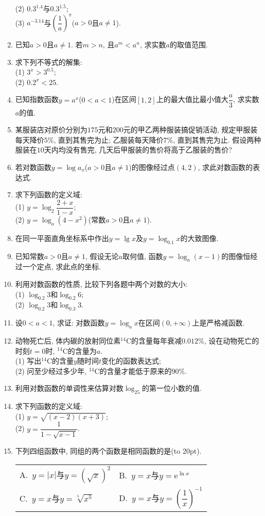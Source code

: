 \documentclass[10pt,a4paper]{article}
\newcommand{\bracket}[1]{(\hbox to #1pt{})}
\newcommand{\twoch}[4]{\par\begin{tabular}{p{.46\textwidth}p{.46\textwidth}}
A.~#1& B.~#2\\
C.~#3& D.~#4
\end{tabular}}
\begin{document}
\begin{enumerate}[1.]
(2) $0.3^{1.4}$与$0.3^{1.5}$;\\
(3) $a^{-3. 14}$与$(\dfrac 1a)^\pi$($a>0$且$a\ne 1$).
\item 已知$a>0$且$a\ne 1$. 若$m>n$, 且$a^m<a^n$, 求实数$a$的取值范围.
\item 求下列不等式的解集:\\
(1) $3^x>3^{0.5}$;\\
(2) $0.2^x<25$. 
\item 已知指数函数$y=a^x$($0<a<1$)在区间$[1, 2]$上的最大值比最小值大$\dfrac a3$, 求实数$a$的值. 
\item 某服装店对原价分别为$175$元和$200$元的甲乙两种服装搞促销活动, 规定甲服装每天降价$5\%$, 直到其售完为止; 乙服装每天降价$7\%$, 直到其售完为止. 假设两种服装在$10$天内均没有售完, 几天后甲服装的售价将高于乙服装的售价? 
\item 若对数函数$y=\log a_x$($a>0$且$a\ne 1$)的图像经过点$(4, 2)$, 求此对数函数的表达式.
\item 求下列函数的定义域:\\
(1) $y=\log_2\dfrac{2+x}{1-x}$;\\
(2) $y=\log_a(4-x^2)$(常数$a>0$且$a\ne 1$).
\item 在同一平面直角坐标系中作出$y=\lg x$及$y=\log_{0.1}x$的大致图像. 
\item 已知常数$a>0$且$a\ne 1$, 假设无论$a$取何值, 函数$y=\log_a(x-1)$的图像恒经过一个定点, 求此点的坐标.
\item 利用对数函数的性质, 比较下列各题中两个对数的大小:\\
(1) $\log_{0.2}3$和$\log_{0.2}6$;\\
(2) $\log_{0.2}3$和$\log_{0.3}3$.
\item 设$0<a<1$, 求证: 对数函数$y=\log_ax$在区间$(0, +\infty)$上是严格减函数.
\item 动物死亡后, 体内碳的放射同位素$^{14}\text{C}$的含量每年衰减$0.012\%$, 设在动物死亡的时刻$t=0$时, $^{14}\text{C}$的含量为$a$.\\
(1) 写出$^{14}\text{C}$的含量$y$随时间$t$变化的函数表达式;\\
(2) 问至少经过多少年, $^{14}\text{C}$的含量才能低于原来的$90\%$.
\item 利用对数函数的单调性来估算对数$\log_25$的第一位小数的值.
\item 求下列函数的定义域:\\
(1) $y=\sqrt{(x-2)(x+3)}$;\\
(2) $y=\dfrac{1}{1-\sqrt{x-1}}$.
\item 下列四组函数中, 同组的两个函数是相同函数的是\bracket{20}.
\twoch{$y=|x|$与$y=(\sqrt x)^2$}{$y=x$与$y=\mathrm{e}^{\ln x}$}{$y=x$与$y=\sqrt[5]{x^5}$}{$y=x$与$y=(\dfrac 1x)^{-1}$}

\end{enumerate}
\end{document}
